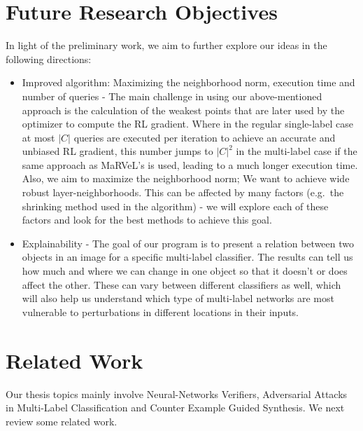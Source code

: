 \documentclass[11pt]{article}
\begin{document}
\section{Future Research Objectives}
In light of the preliminary work, we aim to further explore our ideas in the following directions:
\begin{itemize}
    \item Improved algorithm: Maximizing the neighborhood norm, execution time and number of queries -
    The main challenge in using our above-mentioned approach is the calculation of the weakest points that are later used by the optimizer to compute the RL gradient.
    Where in the regular single-label case at most $|C|$ queries are executed per iteration to achieve an accurate and unbiased RL gradient, this number jumps to $|C|^2$ in the multi-label case if the same approach as MaRVeL's is used, leading to a much longer execution time.
    Also, we aim to maximize the neighborhood norm;
    We want to achieve wide robust layer-neighborhoods.
    This can be affected by many factors (e.g.\ the shrinking method used in the algorithm) - we will explore each of these factors and look for the best methods to achieve this goal.
    \item Explainability - The goal of our program is to present a relation between two objects in an image for a specific multi-label classifier.
    The results can tell us how much and where we can change in one object so that it doesn't or does affect the other.
    These can vary between different classifiers as well, which will also help us understand which type of multi-label networks are most vulnerable to perturbations in different locations in their inputs.
\end{itemize}

\section{Related Work}
Our thesis topics mainly involve Neural-Networks Verifiers, Adversarial Attacks in Multi-Label Classification and Counter Example Guided Synthesis.
We next review some related work.
\end{document}
